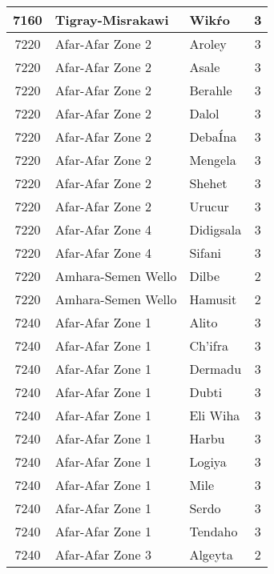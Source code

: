 \documentclass[12pt,a4paper]{report}
\begin{document}
\begin{tabular}{|c|l|l|c|}
\hline 
\rule[-1ex]{0pt}{2.5ex} 7160 & Tigray-Misrakawi & Wik\'ro & 3 \\
\hline 
\rule[-1ex]{0pt}{2.5ex} 7220 & Afar-Afar Zone 2 & Aroley & 3 \\
\hline 
\rule[-1ex]{0pt}{2.5ex} 7220 & Afar-Afar Zone 2 & Asale & 3 \\
\hline 
\rule[-1ex]{0pt}{2.5ex} 7220 & Afar-Afar Zone 2 & Berahle & 3 \\
\hline 
\rule[-1ex]{0pt}{2.5ex} 7220 & Afar-Afar Zone 2 & Dalol & 3 \\
\hline 
\rule[-1ex]{0pt}{2.5ex} 7220 & Afar-Afar Zone 2 & Deba\'Ina & 3 \\
\hline 
\rule[-1ex]{0pt}{2.5ex} 7220 & Afar-Afar Zone 2 & Mengela & 3 \\
\hline 
\rule[-1ex]{0pt}{2.5ex} 7220 & Afar-Afar Zone 2 & Shehet & 3 \\
\hline 
\rule[-1ex]{0pt}{2.5ex} 7220 & Afar-Afar Zone 2 & Urucur & 3 \\
\hline 
\rule[-1ex]{0pt}{2.5ex} 7220 & Afar-Afar Zone 4 & Didigsala & 3 \\
\hline 
\rule[-1ex]{0pt}{2.5ex} 7220 & Afar-Afar Zone 4 & Sifani & 3 \\
\hline 
\rule[-1ex]{0pt}{2.5ex} 7220 & Amhara-Semen Wello & Dilbe & 2 \\
\hline 
\rule[-1ex]{0pt}{2.5ex} 7220 & Amhara-Semen Wello & Hamusit & 2 \\
\hline 
\rule[-1ex]{0pt}{2.5ex} 7240 & Afar-Afar Zone 1 & Alito & 3 \\
\hline 
\rule[-1ex]{0pt}{2.5ex} 7240 & Afar-Afar Zone 1 & Ch'ifra & 3 \\
\hline 
\rule[-1ex]{0pt}{2.5ex} 7240 & Afar-Afar Zone 1 & Dermadu & 3 \\
\hline 
\rule[-1ex]{0pt}{2.5ex} 7240 & Afar-Afar Zone 1 & Dubti & 3 \\
\hline 
\rule[-1ex]{0pt}{2.5ex} 7240 & Afar-Afar Zone 1 & Eli Wiha & 3 \\
\hline 
\rule[-1ex]{0pt}{2.5ex} 7240 & Afar-Afar Zone 1 & Harbu & 3 \\
\hline 
\rule[-1ex]{0pt}{2.5ex} 7240 & Afar-Afar Zone 1 & Logiya & 3 \\
\hline 
\rule[-1ex]{0pt}{2.5ex} 7240 & Afar-Afar Zone 1 & Mile & 3 \\
\hline 
\rule[-1ex]{0pt}{2.5ex} 7240 & Afar-Afar Zone 1 & Serdo & 3 \\
\hline 
\rule[-1ex]{0pt}{2.5ex} 7240 & Afar-Afar Zone 1 & Tendaho & 3 \\
\hline 
\rule[-1ex]{0pt}{2.5ex} 7240 & Afar-Afar Zone 3 & Algeyta & 2 \\

\end{tabular}
\end{document}
